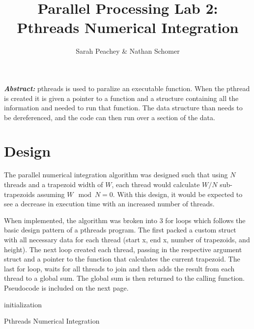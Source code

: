 \documentclass[12pt]{article}
\begin{document}
\title{Parallel Processing Lab 2: \\ Pthreads Numerical Integration}
\author{Sarah Peachey \& Nathan Schomer}
\maketitle

\textbf{\textit{Abstract:}} pthreads is used to paralize an executable function. 
When the pthread is created it is given a pointer to a function and a structure containing 
all the information and needed to run that function. The data structure than needs to be 
dereferenced, and the code can then run over a section of the data. 

\newpage

\vspace{-1.5cm}
\section{Design}
\vspace{-0.25cm}
\qquad The parallel numerical integration algorithm was designed such
that using $N$ threads and a trapezoid width of $W$, each thread would 
calculate $W/N$ sub-trapezoids assuming $W \mod N = 0$. With this design,
it would be expected to see a decrease in execution time with an
increased number of threads. 

When implemented, the algorithm was broken into 3 for loops which
follows the basic design pattern of a pthreads program. 
The first packed 
a custom struct with all necessary data for each thread (start x, end x, 
number of trapezoids, and height). The next loop created each thread,
passing in the respective argument struct and a pointer to the function
that calculates the current trapezoid. The last for loop, waits for
all threads to join and then adds the result from each thread to a 
global sum. The global sum is then returned to the calling function.
Pseudocode is included on the next page. 

\pagebreak
\vspace{1cm}
\begin{algorithm}[H]
 	initialization\;


   	
\caption{Pthreads Numerical Integration}
\end{algorithm}
\end{document}
